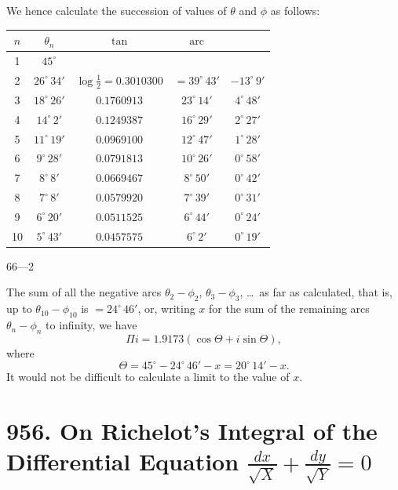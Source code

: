 \documentclass[11pt,a4paper]{book}
\begin{document}
We hence calculate the succession of values of $\theta$ and $\phi$ as follows:

\begin{center}
\begin{tabular}{c|c|c|c|c}
\toprule
$n$ & $\theta_n$ & $\tan$ & $\operatorname{arc}$ & \\
\midrule
1 & $45^{\circ}$ & & & \\
2 & $26^{\circ}\,34'$ & $\log \tfrac{1}{2} = 0.3010300$ & $= 39^{\circ}\,43'$ & $-13^{\circ}\,9'$ \\
3 & $18^{\circ}\,26'$ & $0.1760913$ & $23^{\circ}\,14'$ & $4^{\circ}\,48'$ \\
4 & $14^{\circ}\,2'$ & $0.1249387$ & $16^{\circ}\,29'$ & $2^{\circ}\,27'$ \\
5 & $11^{\circ}\,19'$ & $0.0969100$ & $12^{\circ}\,47'$ & $1^{\circ}\,28'$ \\
6 & $9^{\circ}\,28'$ & $0.0791813$ & $10^{\circ}\,26'$ & $0^{\circ}\,58'$ \\
7 & $8^{\circ}\,8'$ & $0.0669467$ & $8^{\circ}\,50'$ & $0^{\circ}\,42'$ \\
8 & $7^{\circ}\,8'$ & $0.0579920$ & $7^{\circ}\,39'$ & $0^{\circ}\,31'$ \\
9 & $6^{\circ}\,20'$ & $0.0511525$ & $6^{\circ}\,44'$ & $0^{\circ}\,24'$ \\
10 & $5^{\circ}\,43'$ & $0.0457575$ & $6^{\circ}\,2'$ & $0^{\circ}\,19'$ \\
\bottomrule
\end{tabular}
\end{center}

\hfill 66---2

\newpage

The sum of all the negative arcs $\theta_2-\phi_2$, $\theta_3-\phi_3$, \dots\ as far as calculated, that is, up to $\theta_{10}-\phi_{10}$ is $= 24^{\circ}\,46'$, or, writing $x$ for the sum of the remaining arcs $\theta_n-\phi_n$ to infinity, we have
\[
\Pi i = 1.9173(\cos\Theta + i\sin\Theta),
\]
where
\[
\Theta = 45^{\circ} - 24^{\circ}\,46' - x = 20^{\circ}\,14' - x.
\]
It would not be difficult to calculate a limit to the value of $x$.

\newpage
\section{956. On Richelot's Integral of the Differential Equation $\frac{dx}{\sqrt{X}} + \frac{dy}{\sqrt{Y}} = 0$}
\label{sec:956}
\end{document}
